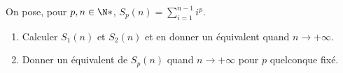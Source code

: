 \begin{enonce}
\begin{exercise}[ID={RMS133 E1345},subtitle={IMT MP 2022},tags={},difficulty={}]
  On pose, pour $p,n\in\N*$, $S_p(n)=\sum\limits_{i=1}^{n-1} i^p$.
  \begin{enumerate}
    \item Calculer $S_1(n)$ et $S_2(n)$ et en donner un équivalent quand $n\to+\infty$.
    \item Donner un équivalent de $S_p(n)$ quand $n\to+\infty$ pour $p$ quelconque fixé.
  \end{enumerate}
\end{exercise}
\begin{solution}
\end{solution}
\end{enonce}
